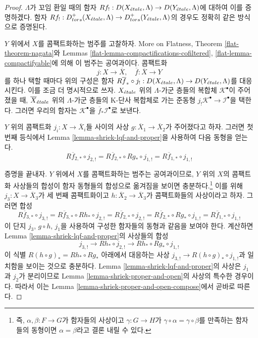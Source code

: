 \begin{proof}
$\Lambda$가 꼬임 환일 때의 함자
$Rf_! : D(X_{\acute{e}tale}, \Lambda) \to D(Y_{\acute{e}tale}, \Lambda)$에 대하여
이를 증명하겠다. 함자
$Rf_! : D^+_{tors}(X_{\acute{e}tale}, \Lambda) \to D^+_{tors}(Y_{\acute{e}tale}, \Lambda)$의
경우도 정확히 같은 방식으로 증명된다.

\medskip\noindent
$Y$ 위에서 $X$를 콤팩트화하는 범주를 고찰하자. More on Flatness,
Theorem \ref{flat-theorem-nagata}와 Lemmas
\ref{flat-lemma-compactifications-cofiltered},
\ref{flat-lemma-compactifyable}에 의해 이 범주는 공여과이다.
콤팩트화
$$
j : X \to \overline{X},\quad \overline{f} : \overline{X} \to Y
$$
를 하나 택할 때마다 위의 구성은 함자
$R\overline{f}_* \circ j_! :
D(X_{\acute{e}tale}, \Lambda) \to D(Y_{\acute{e}tale}, \Lambda)$를 대응시킨다.
이를 조금 더 명시적으로 쓰자. $X_{\acute{e}tale}$ 위의 $\Lambda$-가군 층들의
복합체 $\mathcal{K}^\bullet$이 주어졌을 때,
$\overline{X}_{\acute{e}tale}$ 위의 $\Lambda$-가군 층들의 K-단사 복합체로 가는
준동형
$j_!\mathcal{K}^\bullet \to \mathcal{I}^\bullet$을 택한다.
그러면 우리의 함자는 $\mathcal{K}^\bullet$을
$\overline{f}_*\mathcal{I}^\bullet$로 보낸다.

\medskip\noindent
$Y$ 위의 콤팩트화 $j_i : X \to \overline{X}_i$들 사이의 사상
$g : \overline{X}_1 \to \overline{X}_2$가 주어졌다고 하자.
그러면 첫 번째 등식에서 Lemma
\ref{lemma-shriek-lqf-and-proper}을 사용하여 다음 동형을 얻는다.
$$
R\overline{f}_{2, *} \circ j_{2, !} =
R\overline{f}_{2, *} \circ Rg_* \circ j_{1, !} =
R\overline{f}_{1, *} \circ j_{1, !}
$$

\medskip\noindent
증명을 끝내자. $Y$ 위에서 $X$를 콤팩트화하는 범주는 공여과이므로,
$Y$ 위의 $X$의 콤팩트화 사상들의 합성이 함자 동형들의 합성으로
옮겨짐을 보이면 충분하다.\footnote{즉, $\alpha, \beta : F \to G$가
함자들의 사상이고 $\gamma : G \to H$가
$\gamma \circ \alpha = \gamma \circ \beta$를 만족하는 함자들의
동형이면 $\alpha = \beta$라고 결론 내릴 수 있다.}
이를 위해 $j_3 : X \to \overline{X}_3$가 세 번째 콤팩트화이고
$h : \overline{X}_2 \to \overline{X}_3$가 콤팩트화들의 사상이라고 하자.
그러면 합성
$$
R\overline{f}_{3, *} \circ j_{3, !} =
R\overline{f}_{3, *} \circ Rh_* \circ j_{2, !} =
R\overline{f}_{2, *} \circ j_{2, !} =
R\overline{f}_{2, *} \circ Rg_* \circ j_{1, !} =
R\overline{f}_{1, *} \circ j_{1, !}
$$
이 단지 $j_3$, $g \circ h$, $j_1$을 사용하여 구성한 함자들의 동형과
같음을 보여야 한다.
계산하면 Lemma \ref{lemma-shriek-lqf-and-proper}의 사상들의 합성
$$
j_{3, !} \to Rh_* \circ j_{2, !} \to Rh_* \circ Rg_* \circ j_{1, !}
$$
이 식별 $R(h \circ g)_* = Rh_* \circ Rg_*$ 아래에서 대응하는 사상
$j_{3, !} \to R(h \circ g)_* \circ j_{1, !}$과 일치함을 보이는 것으로
충분하다. Lemma \ref{lemma-shriek-lqf-and-proper}의 사상은
$j_1$과 $j_2$가 분리이므로 Lemma
\ref{lemma-shriek-proper-and-open}의 사상의 특수한 경우이다.
따라서 이는 Lemma
\ref{lemma-shriek-proper-and-open-compose}에서 곧바로 따른다.
\end{proof}

